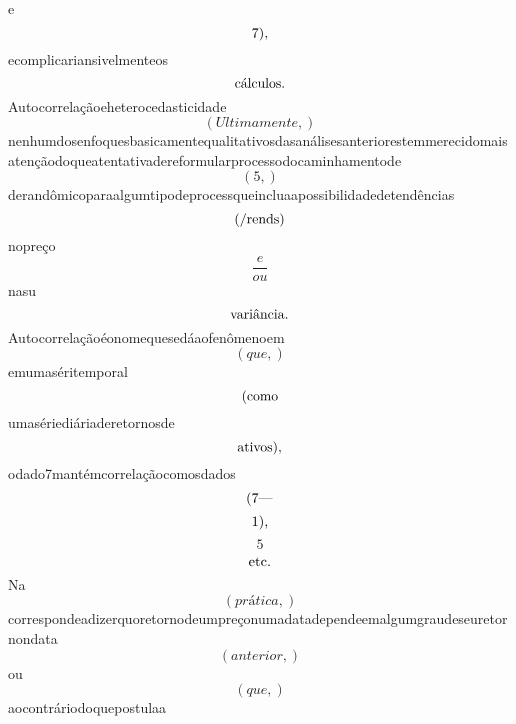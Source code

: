 \documentclass{article}
\begin{document}
\begin{equation}
\end{equation}e\begin{equation}
$7),$
\end{equation}ecomplicariansivelmenteos\begin{equation}
$cálculos.$
\end{equation}Autocorrelaçãoeheterocedasticidade\begin{equation}
\left( Ultimamente,\right)
\end{equation}nenhumdosenfoquesbasicamentequalitativosdasanálisesanteriorestemmerecidomaisatençãodoqueatentativadereformularprocessodocaminhamentode\begin{equation}
\left( 5,\right)
\end{equation}derandômicoparaalgumtipodeprocessqueincluaapossibilidadedetendências\begin{equation}
$(/rends)$
\end{equation}nopreço\begin{equation}
\frac{e}{ou}
\end{equation}nasu\begin{equation}
$variância.$
\end{equation}Autocorrelaçãoéonomequesedáaofenômenoem\begin{equation}
\left( que,\right)
\end{equation}emumaséritemporal\begin{equation}
$(como$
\end{equation}umasériediáriaderetornosde\begin{equation}
$ativos),$
\end{equation}odado7mantémcorrelaçãocomosdados\begin{equation}
$(7—$
\end{equation}\begin{equation}
$1),$
\end{equation}\begin{equation}
5
\end{equation}\begin{equation}
$etc.$
\end{equation}Na\begin{equation}
\left( prática,\right)
\end{equation}correspondeadizerquoretornodeumpreçonumadatadependeemalgumgraudeseuretornondata\begin{equation}
\left( anterior,\right)
\end{equation}ou\begin{equation}
\left( que,\right)
\end{equation}aocontráriodoquepostulaa\begin{equation}

\end{equation}
\end{document}
